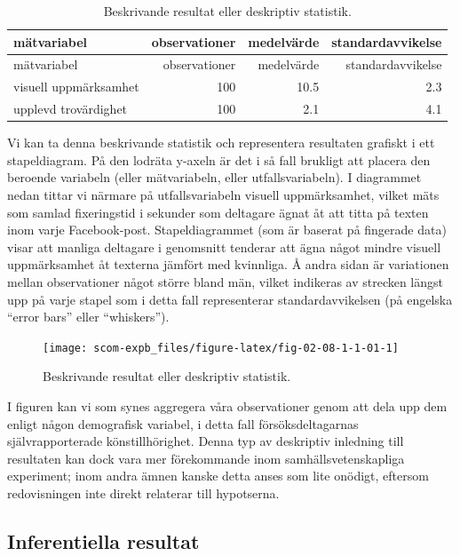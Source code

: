 \documentclass[
]{book}
\begin{document}
\begin{longtable}[]{@{}lrrr@{}}
\caption{\label{tab:tab-02-08-1-1-01}Beskrivande resultat eller deskriptiv statistik.}\tabularnewline
\toprule
mätvariabel & observationer & medelvärde & standardavvikelse\tabularnewline
\midrule
\endfirsthead
\toprule
mätvariabel & observationer & medelvärde & standardavvikelse\tabularnewline
\midrule
\endhead
visuell uppmärksamhet & 100 & 10.5 & 2.3\tabularnewline
upplevd trovärdighet & 100 & 2.1 & 4.1\tabularnewline
\bottomrule
\end{longtable}

Vi kan ta denna beskrivande statistik och representera resultaten grafiskt i ett stapeldiagram. På den lodräta y-axeln är det i så fall brukligt att placera den beroende variabeln (eller mätvariabeln, eller utfallsvariabeln). I diagrammet nedan tittar vi närmare på utfallsvariabeln visuell uppmärksamhet, vilket mäts som samlad fixeringstid i sekunder som deltagare ägnat åt att titta på texten inom varje Facebook-post. Stapeldiagrammet (som är baserat på fingerade data) visar att manliga deltagare i genomsnitt tenderar att ägna något mindre visuell uppmärksamhet åt texterna jämfört med kvinnliga. Å andra sidan är variationen mellan observationer något större bland män, vilket indikeras av strecken längst upp på varje stapel som i detta fall representerar standardavvikelsen (på engelska ``error bars'' eller ``whiskers'').

\begin{figure}

{\centering \texttt{[image: scom-expb\_files/figure-latex/fig-02-08-1-1-01-1]} 

}

\caption{Beskrivande resultat eller deskriptiv statistik.}\label{fig:fig-02-08-1-1-01}
\end{figure}

I figuren kan vi som synes aggregera våra observationer genom att dela upp dem enligt någon demografisk variabel, i detta fall försöksdeltagarnas självrapporterade könstillhörighet. Denna typ av deskriptiv inledning till resultaten kan dock vara mer förekommande inom samhällsvetenskapliga experiment; inom andra ämnen kanske detta anses som lite onödigt, eftersom redovisningen inte direkt relaterar till hypotserna.

\hypertarget{sub08.1.2}{%
\subsection{Inferentiella resultat}\label{sub08.1.2}}
\end{document}
